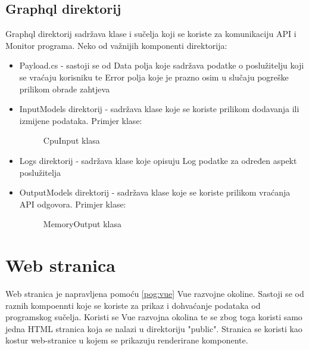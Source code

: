 \documentclass[zavrsnirad]{fer}
\begin{document}
\section{Graphql direktorij}
Graphql direktorij sadržava klase i sučelja koji se koriste za komunikaciju API i Monitor programa.
Neko od važnijih komponenti direktorija:
\begin{itemize}
	\item Payload.cs - sastoji se od Data polja koje sadržava podatke o poslužitelju koji se vraćaju korisniku te Error polja koje je prazno osim u slučaju pogreške prilikom obrade zahtjeva
	\item InputModels direktorij - sadržava klase koje se koriste prilikom dodavanja ili izmijene podataka. Primjer klase:
	\begin{figure}[htb]
		\centering
		
		\caption{CpuInput klasa}
	\end{figure}
	\FloatBarrier
	\item Logs direktorij - sadržava klase koje opisuju Log podatke za određen aspekt poslužitelja
	\item OutputModels direktorij - sadržava klase koje se koriste prilikom vraćanja API odgovora. Primjer klase:
	\begin{figure}[htb]
		\centering
		
		\caption{MemoryOutput klasa}
	\end{figure}
	\FloatBarrier
\end{itemize}

\chapter{Web stranica}
Web stranica je napravljena pomoću \ref{pog:vue} Vue razvojne okoline. Sastoji se od raznih kompoennti koje se koriste za prikaz i dohvaćanje podataka od programskog sučelja.
Koristi se Vue razvojna okolina te se zbog toga koristi samo jedna HTML stranica koja se nalazi u direktoriju "public". Stranica se koristi kao kostur web-stranice u kojem se prikazuju renderirane komponente.
\end{document}
